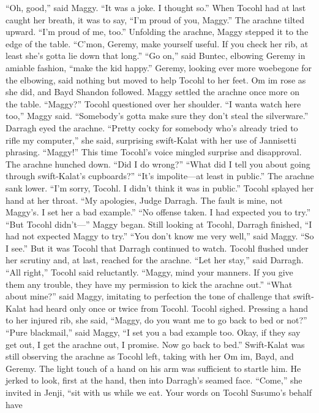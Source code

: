 \documentclass[9pt]{article}
\begin{document}
“Oh, good,” said Maggy. “It was a joke. I thought so.”
When Tocohl had at last caught her breath, it was to say, “I’m proud of you, Maggy.”
The arachne tilted upward. “I’m proud of me, too.” Unfolding the arachne, Maggy stepped it to the
edge of the table. “C’mon, Geremy, make yourself useful. If you check her rib, at least she’s gotta lie
down that long.”
“Go on,” said Buntec, elbowing Geremy in amiable fashion, “make the kid happy.”
Geremy, looking ever more woebegone for the elbowing, said nothing but moved to help Tocohl to
her feet. Om im rose as she did, and Bayd Shandon followed. Maggy settled the arachne once more on
the table. “Maggy?” Tocohl questioned over her shoulder.
“I wanta watch here too,” Maggy said. “Somebody’s gotta make sure they don’t steal the
silverware.”
Darragh eyed the arachne. “Pretty cocky for somebody who’s already tried to rifle my computer,”
she said, surprising swift-Kalat with her use of Jannisetti phrasing.
“Maggy!” This time Tocohl’s voice mingled surprise and disapproval.
The arachne hunched down. “Did I do wrong?”
“What did I tell you about going through swift-Kalat’s cupboards?”
“It’s impolite—at least in public.” The arachne sank lower. “I’m sorry, Tocohl. I didn’t think it was in
public.”
Tocohl splayed her hand at her throat. “My apologies, Judge Darragh. The fault is mine, not
Maggy’s. I set her a bad example.”
“No offense taken. I had expected you to try.”
“But Tocohl didn’t—” Maggy began.
Still looking at Tocohl, Darragh finished, “I had not expected Maggy to try.”
“You don’t know me very well,” said Maggy.
“So I see.” But it was Tocohl that Darragh continued to watch. Tocohl flushed under her scrutiny
and, at last, reached for the arachne. “Let her stay,” said Darragh.
“All right,” Tocohl said reluctantly. “Maggy, mind your manners. If you give them any trouble, they
have my permission to kick the arachne out.”
“What about mine?” said Maggy, imitating to perfection the tone of challenge that swift-Kalat had
heard only once or twice from Tocohl.
Tocohl sighed. Pressing a hand to her injured rib, she said, “Maggy, do you want me to go back to
bed or not?”
“Pure blackmail,” said Maggy, “I set you a bad example too. Okay, if they say get out, I get the
arachne out, I promise. Now go back to bed.”
Swift-Kalat was still observing the arachne as Tocohl left, taking with her Om im, Bayd, and
Geremy. The light touch of a hand on his arm was sufficient to startle him. He jerked to look, first at the
hand, then into Darragh’s seamed face.
“Come,” she invited in Jenji, “sit with us while we eat. Your words on Tocohl Susumo’s behalf have
\end{document}
